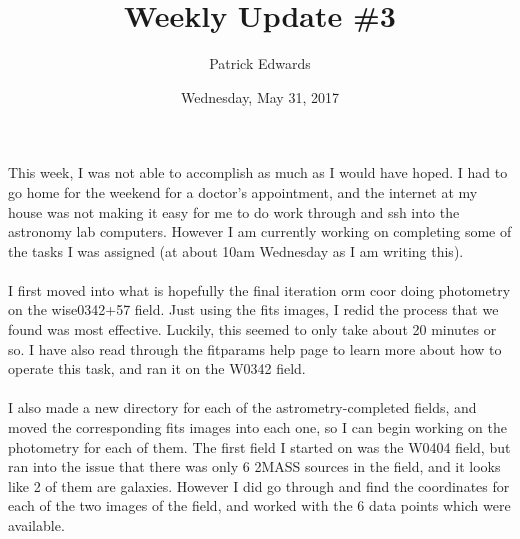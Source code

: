 \documentclass[a4paper]{article}
\title{Weekly Update \#3}
\author{Patrick Edwards}
\begin{document}
\date{Wednesday, May 31, 2017}
\maketitle

This week, I was not able to accomplish as much as I would have hoped.  I had to go home for the weekend for a doctor's appointment, and the internet at my house was not making it easy for me to do work through and ssh into the astronomy lab computers.  However I am currently working on completing some of the tasks I was assigned (at about 10am Wednesday as I am writing this). \\ \\
I first moved into what is hopefully the final iteration orm coor doing photometry on the wise0342+57 field.  Just using the fits images, I redid the process that we found was most effective.  Luckily, this seemed to only take about 20 minutes or so.  I have also read through the fitparams help page to learn more about how to operate this task, and ran it on the W0342 field. \\ \\
I also made a new directory for each of the astrometry-completed fields, and moved the corresponding fits images into each one, so I can begin working on the photometry for each of them.  The first field I started on was the W0404 field, but ran into the issue that there was only 6 2MASS sources in the field, and it looks like 2 of them are galaxies.  However I did go through and find the coordinates for each of the two images of the field, and worked with the 6 data points which were available.
\end{document}
